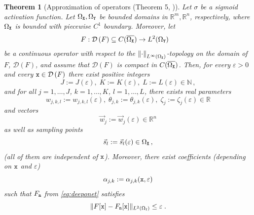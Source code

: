 \documentclass[10pt]{article}
\numberwithin{equation}{section}
\newtheorem{theorem}[theorem]{Theorem}
\theoremstyle{nonumberplain}
\newcommand{\N}{\mathds{N}}
\newcommand{\R}{\mathds{R}}
\newcommand{\dom}[1]{\mathcal{D}\left(#1\right)}
\newcommand{\norm}[1]{\left\|#1\right\|}
\newcommand{\norms}[1]{\|#1\|}
\newcommand{\ve}{\varepsilon}
\newcommand{\bs}{\vec{s}}
\newcommand{\bw}{{\vec{w}}}
\newcommand{\X}{{\tt X}}
\newcommand{\Y}{{\tt Y}}
\newcommand{\n}{{\tt n}}
\newcommand{\x}{{\tt x}}
\begin{document}
\begin{theorem}[Approximation of operators (Theorem 5, \cite{TiaHon95})]\label{th:operatorapxc} 
	Let $\sigma$ be a  sigmoid activation function. Let $\Omega_\X, \Omega_\Y$ be bounded domains in $\R^m, \R^n$, respectively, where $\Omega_\X$ is bounded with piecewise $C^1$ boundary. Moreover, let 
	\begin{align*}
		F: \dom{F} \subseteq C(\overline{\Omega_\X}) &\to L^2(\Omega_\Y)
	\end{align*}
	be a continuous operator with respect to the $\norm{\cdot}_{L^\infty(\Omega_\X)}$-topology on the domain of $F$, $\dom{F}$, and assume that $\dom{F}$ is compact in $C(\overline{\Omega_\X})$. 	
	Then, for every $\ve >0$ and every $\x \in \dom{F}$ there exist positive integers 
	$$J := J(\ve), \; K := K(\ve),\; L := L(\ve) \in \N\,,$$ 
	and for all $j=1,\dots,J$, $k=1,\dots,K$, $l=1,\dots, L$, there exists real parameters
	$$ w_{j,k,l}:= w_{j,k,l}(\ve), \; \theta_{j,k} := \theta_{j,k}(\ve),\;
	\zeta_{j}:= \zeta_j(\ve) \in \R$$ 
	and vectors $$\bw_j:=\bw_j(\ve) \in \R^n$$ as well as sampling points 
	$$\bs_l:=\bs_l(\ve) \in \Omega_\X\,,$$
	(all of them are independent of $\x$). Moreover, there exist coefficients (depending on $\x$ and $\ve$) 
	$$\alpha_{j,k} := \alpha_{j,k}(\x,\ve)$$ such that $F_\n$ from \autoref{eq:deeponet} satisfies
	\begin{equation*}
		\norms{F[\x]-F_\n[\x]}_{L^2(\Omega_\Y)} \leq \ve\;.
	\end{equation*}
\end{theorem}
\end{document}
